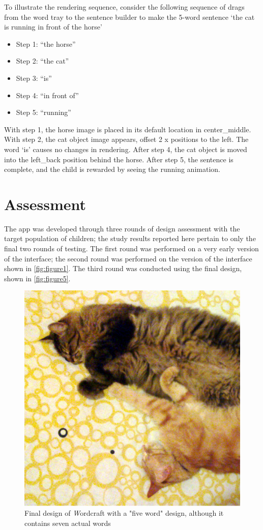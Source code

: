 \documentclass{sigchi-ext}
\begin{document}
To illustrate the rendering sequence, consider the following sequence of drags from the word tray to the sentence builder to make the 5-word sentence ‘the cat is running in front of the horse’

\begin{itemize}\compresslist
\item 
Step 1: ``the horse''
\item 	
Step 2: ``the cat''
\item 	
Step 3: ``is''
\item 	
Step 4: ``in front of''
\item 	
Step 5: ``running''
\end{itemize}

With step 1, the horse image is placed in its default location in center_middle.  With step 2, the cat object image appears, offset 2 x positions to the left.   The word ‘is’ causes no changes in rendering.  After step 4, the cat object is moved into the left_back position behind the horse.  After step 5, the sentence is complete, and the child is rewarded by seeing the running animation.

\section{Assessment}
The app was developed through three rounds of design assessment with the target population of children; the study results reported here pertain to only the final two rounds of testing.  The first round was performed on a very early version of the interface; the second round was performed on the version of the interface shown in \autoref {fig:figure1}.  The third round was conducted using the final design, shown in \autoref {fig:figure5}.

\begin{figure}
  \centering
  \includegraphics[width=0.7\columnwidth]{figures/cats.png}
  \caption{ Final design of \emph Wordcraft with a "five word" design, although it contains seven actual words}
  \label{fig:figure5}
\end{figure}
\end{document}
